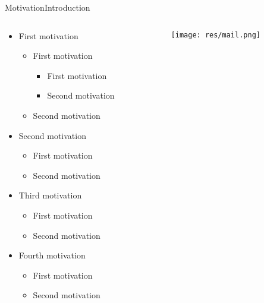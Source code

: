 \begin{frame}{Motivation}{Introduction}%

	\begin{columns}
		\begin{column}{0.5\textwidth}
		
			\begin{itemize}
				\item First motivation
					\begin{itemize}
						\item First motivation
						\begin{itemize}
							\item First motivation
							\item Second motivation
						\end{itemize}
						\item Second motivation
					\end{itemize}
				\item Second motivation
					\begin{itemize}
						\item First motivation
						\item Second motivation
					\end{itemize}
				\item Third motivation
					\begin{itemize}
						\item First motivation
						\item Second motivation
					\end{itemize}
				\item Fourth motivation
					\begin{itemize}
						\item First motivation
						\item Second motivation
					\end{itemize}
			\end{itemize}
			
		\end{column}
	
		\begin{column}{0.5\textwidth}
			\begin{center}
			
				\begin{figure}
					\texttt{[image: res/mail.png]}
					\caption{\label{fig:}}
				\end{figure}
				
			\end{center}
		\end{column}
	

\end{columns}
\end{frame}
